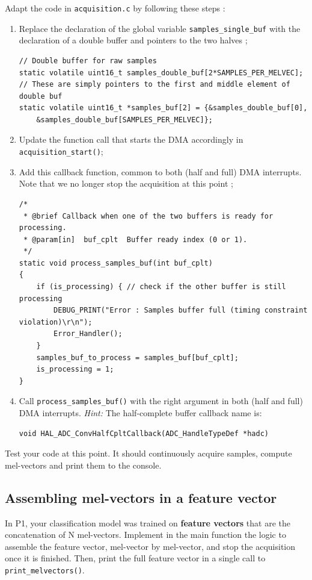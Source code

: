Adapt the code in \texttt{acquisition.c} by following these steps :
\begin{enumerate}
    \item Replace the declaration of the global variable \texttt{samples\_single\_buf} with the declaration of a double buffer and pointers to the two halves ;
\begin{lstlisting}
// Double buffer for raw samples
static volatile uint16_t samples_double_buf[2*SAMPLES_PER_MELVEC];
// These are simply pointers to the first and middle element of double buf
static volatile uint16_t *samples_buf[2] = {&samples_double_buf[0],
    &samples_double_buf[SAMPLES_PER_MELVEC]};
\end{lstlisting}
    \item Update the function call that starts the DMA accordingly in \texttt{acquisition\_start()};
    \item Add this callback function, common to both (half and full) DMA interrupts. Note that we no longer stop the acquisition at this point ;
\begin{lstlisting}
/*
 * @brief Callback when one of the two buffers is ready for processing.
 * @param[in]  buf_cplt  Buffer ready index (0 or 1).
 */
static void process_samples_buf(int buf_cplt)
{
    if (is_processing) { // check if the other buffer is still processing
        DEBUG_PRINT("Error : Samples buffer full (timing constraint violation)\r\n");
        Error_Handler();
    }
    samples_buf_to_process = samples_buf[buf_cplt];
    is_processing = 1;
}
\end{lstlisting}
    \item Call \texttt{process\_samples\_buf()} with the right argument in both (half and full) DMA interrupts. \textit{Hint:} The half-complete buffer callback name is:
    \begin{lstlisting}
void HAL_ADC_ConvHalfCpltCallback(ADC_HandleTypeDef *hadc)
    \end{lstlisting}
\end{enumerate}

Test your code at this point. It should continuously acquire samples, compute mel-vectors and print them to the console.

\subsection{Assembling mel-vectors in a feature vector}

In P1, your classification model was trained on \textbf{feature vectors} that are the concatenation of N mel-vectors. Implement in the main function the logic to assemble the feature vector, mel-vector by mel-vector, and stop the acquisition once it is finished. Then, print the full feature vector in a single call to \texttt{print\_melvectors()}.

